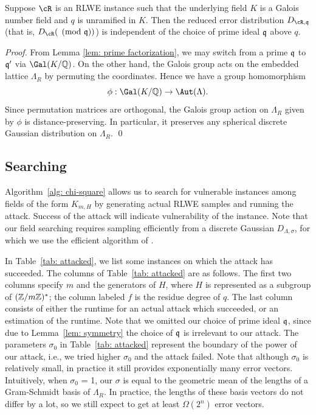 \documentclass[envcountsame]{llncs}
\begin{document}
\begin{lemma} \label{lem: symmetry}
Suppose $\cR$ is an RLWE instance such that the underlying field $K$ is a Galois number field and $q$ is unramified in $K$. Then the reduced error distribution $D_{\cR,\fq}$ (that is, $D_{\cR} (\pmod{\fq})$) is independent of the choice of prime ideal $\mathfrak{q}$ above $q$.
\end{lemma}

\begin{proof}
        From Lemma \ref{lem: prime factorization}, we may switch from a prime $\mathfrak{q}$ to $\mathfrak{q}'$ via $\Gal(K/\bQ)$. On the other hand, the Galois group acts on the embedded lattice $\Lambda_R$ by permuting the coordinates. Hence we have a group homomorphism $$\phi: \Gal(K/\bQ) \to \Aut(\Lambda).$$ Since permutation matrices are orthogonal, the Galois group action on $\Lambda_R$ given by $\phi$ is distance-preserving. In particular, it preserves any spherical discrete Gaussian distribution on $\Lambda_R$.
\qed \end{proof}

\subsection{Searching}

Algorithm~\ref{alg: chi-square} allows us to search for vulnerable instances among fields of the form $K_{m,H}$ by generating actual RLWE samples and running the attack. Success of the attack will indicate vulnerability of the instance. Note that our field searching requires sampling efficiently from a discrete Gaussian $D_{\Lambda, \sigma}$, for which we use the efficient algorithm of \cite{gentry2008trapdoors}.


In Table~\ref{tab: attacked}, we list some instances on which the attack has succeeded. The columns of Table~\ref{tab: attacked} are as follows. The first two columns specify $m$ and the generators of $H$, where $H$ is represented as
a subgroup of $(\mathbb{Z}/m\mathbb{Z})^*$; the column labeled $f$ is the residue degree of $q$. The last column consists of either the runtime for an actual attack which succeeded, or an estimation of the runtime. Note that we omitted our choice of prime ideal $\mathfrak{q}$, since due to Lemma~\ref{lem: symmetry} the choice of $\mathfrak{q}$ is irrelevant to our attack. The parameters $\sigma_0$ in Table~\ref{tab: attacked} represent the boundary of the power of our attack, i.e., we tried higher $\sigma_0$ and the attack failed. Note that although $\sigma_0$ is relatively small, in practice it still provides exponentially many error vectors. Intuitively, when $\sigma_0$ = 1, our $\sigma$ is equal to the geometric mean of the lengths of a Gram-Schmidt basis of $\Lambda_R$. In practice, the lengths of these basis vectors do not differ by a lot, so we still expect to get at least $\Omega(2^n)$ error vectors.
\end{document}

